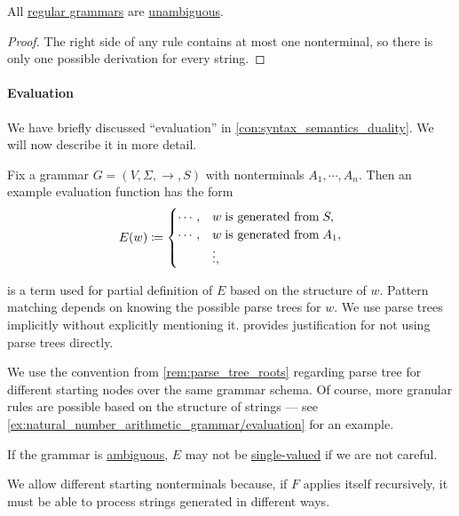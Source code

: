 \begin{proposition}\label{thm:regular_grammars_are_unambiguous}
  All \hyperref[def:chomsky_hierarchy/regular]{regular grammars} are \hyperref[def:grammar_ambiguity]{unambiguous}.
\end{proposition}
\begin{proof}
  The right side of any rule contains at most one nonterminal, so there is only one possible derivation for every string.
\end{proof}

\paragraph{Evaluation}

\begin{concept}\label{con:evaluation}
  We have briefly discussed \enquote{evaluation} in \cref{con:syntax_semantics_duality}. We will now describe it in more detail.

  Fix a grammar \( G = (V, \Sigma, \to, S) \) with nonterminals \( A_1, \cdots, A_n \). Then an example evaluation function has the form
  \begin{equation*}
    E(w) \coloneqq \begin{cases}
      \cdots, &w \T{is generated from} S, \\
      \cdots, &w \T{is generated from} A_1, \\
              &\vdots,
    \end{cases}
  \end{equation*}

   is a term used for partial definition of \( E \) based on the structure of \( w \). Pattern matching depends on knowing the possible parse trees for \( w \). We use parse trees implicitly without explicitly mentioning it.  provides justification for not using parse trees directly.

  We use the convention from \cref{rem:parse_tree_roots} regarding parse tree for different starting nodes over the same grammar schema. Of course, more granular rules are possible based on the structure of strings --- see \cref{ex:natural_number_arithmetic_grammar/evaluation} for an example.
\end{concept}
\begin{comments}
  \item If the grammar is \hyperref[def:grammar_ambiguity]{ambiguous}, \( E \) may not be \hyperref[def:function]{single-valued} if we are not careful.
  \item We allow different starting nonterminals because, if \( F \) applies itself recursively, it must be able to process strings generated in different ways.
\end{comments}

